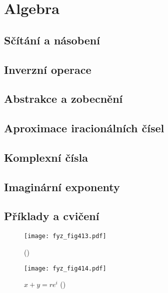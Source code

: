 {
\chapter{Algebra}\label{fyz:IchapXXII}
\minitoc
\section{Sčítání a násobení}\label{fyz:IchapXXIIsecI}
\section{Inverzní operace}\label{fyz:IchapXXIIsecII}
\section{Abstrakce a zobecnění}\label{fyz:IchapXXIIsecIII}
\section{Aproximace iracionálních čísel}\label{fyz:IchapXXIIsecIV}
\section{Komplexní čísla}\label{fyz:IchapXXIIsecV}
\section{Imaginární exponenty}\label{fyz:IchapXXIIsecVI}
\section{Příklady a cvičení}\label{fyz:IchapXXIIsecVIII}

  \begin{figure}[ht!] %
    \centering
    \texttt{[image: fyz\_fig413.pdf]}
    \caption{
             (\cite[s.~306]{Feynman01})}
    \label{fyz_fig413}
  \end{figure}

  \begin{figure}[ht!] %
    \centering
    \texttt{[image: fyz\_fig414.pdf]}
    \caption{\(x + y = re^i\)
             (\cite[s.~306]{Feynman01})}
    \label{fyz_fig414}
  \end{figure}
  
} %
\printbibliography[title={Seznam literatury}, heading=subbibliography]
